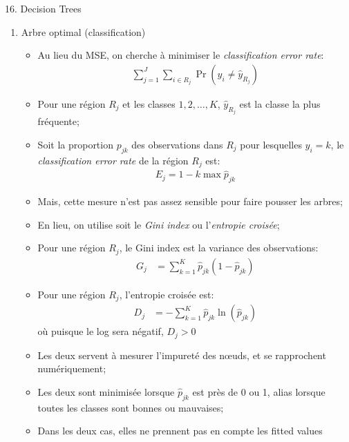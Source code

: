 \documentclass[12pt, titlepage, french]{report}
\begin{document}
\begin{CHPT_SUMM}[label = {DECISION-TREES}]{16. Decision Trees}
\begin{enumerate}
\begin{itemize}
		\item	Nous sélectionnons alors le $\alpha$ optimal selon la \textit{validation croisée};
		\end{itemize}
%		
	\item[]	Arbre optimal (classification)
		\begin{itemize}
		\item	Au lieu du MSE, on cherche à minimiser le \textit{classification error rate}:
			\begin{align*}
			\sum_{j = 1}^{J} \sum_{i \in R_{j}} \Pr(y_{i} \neq \hat{y}_{R_{j}})
			\end{align*}
		\item	Pour une région $R_{j}$ et les classes $1, 2, \dots, K$, $\hat{y}_{R_{j}}$ est la classe la plus fréquente;
		\item	Soit la proportion $p_{jk}$ des observations dans $R_{j}$ pour lesquelles $y_{i} = k$, le \textit{classification error rate} de la région $R_{j}$ est:
			\begin{align*}
			E_{j}	=	1 - \underset{}k{\max} \hat{p}_{jk}
			\end{align*}
		\item	Mais, cette mesure n'est pas assez sensible pour faire pousser les arbres;
		\item	En lieu, on utilise soit le \textit{Gini index} ou l'\textit{entropie croisée};
		\item	Pour une région $R_{j}$, le Gini index est la variance des observations: 
			\begin{align*}
			G_{j}	&=	\sum_{k = 1}^{K} \hat{p}_{jk} (1 - \hat{p}_{jk})
			\end{align*}
		\item	Pour une région $R_{j}$, l'entropie croisée est:
			\begin{align*}
			D_{j}	&=	-\sum_{k = 1}^{K} \hat{p}_{jk} \ln (\hat{p}_{jk})
			\end{align*}
				où puisque le log sera négatif, $D_{j} > 0$
		\item	Les deux servent à mesurer l'impureté des nœuds, et se rapprochent numériquement;
		\item	Les deux sont minimisée lorsque $\hat{p}_{jk}$ est près de 0 ou 1, alias lorsque toutes les classes sont bonnes ou mauvaises;
		\item	Dans les deux cas, elles ne prennent pas en compte les fitted values
		\end{itemize}
		

\end{enumerate}
\end{CHPT_SUMM}
\end{document}
